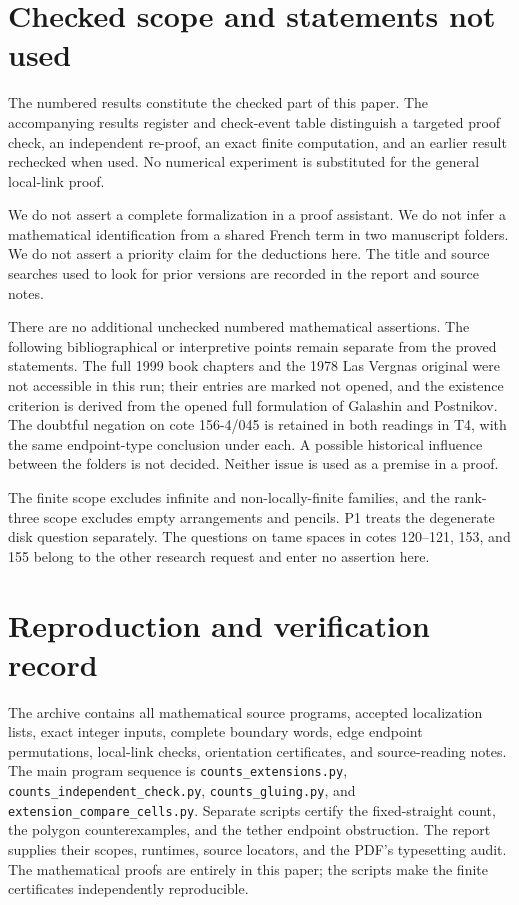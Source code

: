 \section{Checked scope and statements not used}

The numbered results constitute the checked part of this paper. The
accompanying results register and check-event table distinguish a
targeted proof check, an independent re-proof, an exact finite
computation, and an earlier result rechecked when used. No numerical
experiment is substituted for the general local-link proof.

We do not assert a complete formalization in a proof assistant. We do
not infer a mathematical identification from a shared French term in
two manuscript folders. We do not assert a priority claim for the
deductions here. The title and source searches used to look for prior
versions are recorded in the report and source notes.

There are no additional unchecked numbered mathematical assertions.
The following bibliographical or interpretive points remain separate
from the proved statements. The full 1999 book chapters and the 1978
Las Vergnas original were not accessible in this run; their entries
are marked not opened, and the existence criterion is derived from
the opened full formulation of Galashin and Postnikov. The doubtful
negation on cote 156-4/045 is retained in both readings in T4, with
the same endpoint-type conclusion under each. A possible historical
influence between the folders is not decided. Neither issue is used
as a premise in a proof.

The finite scope excludes infinite and non-locally-finite families,
and the rank-three scope excludes empty arrangements and pencils.
P1 treats the degenerate disk question separately. The questions on
tame spaces in cotes 120--121, 153, and 155 belong to the other
research request and enter no assertion here.

\section{Reproduction and verification record}
The archive contains all mathematical source programs, accepted
localization lists, exact integer inputs, complete boundary words,
edge endpoint permutations, local-link checks, orientation certificates,
and source-reading notes. The main program sequence is
\texttt{counts\_extensions.py},
\texttt{counts\_independent\_check.py},
\texttt{counts\_gluing.py}, and
\texttt{extension\_compare\_cells.py}. Separate scripts certify the
fixed-straight count, the polygon counterexamples, and the tether
endpoint obstruction. The report supplies their scopes, runtimes,
source locators, and the PDF's typesetting audit. The mathematical
proofs are entirely in this paper; the scripts make the finite
certificates independently reproducible.
